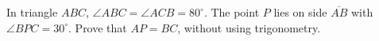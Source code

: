 In triangle $ABC$, $\angle ABC=\angle ACB=80^\circ$. The point $P$ lies on side $\overline{AB}$ with $\angle BPC=30^\circ$. Prove that $AP=BC$, without using trigonometry.
